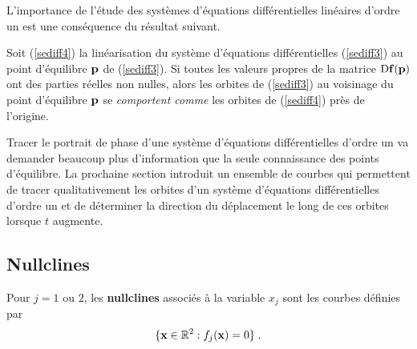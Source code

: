 {L'importance de l'étude des systèmes d'équations différentielles linéaires
d'ordre un est une conséquence du résultat suivant.

\begin{prop} \label{HartGrob}
Soit (\ref{sediff4}) la linéarisation du système d'équations
différentielles (\ref{sediff3}) au point d'équilibre $\mathbf{p}$ de
(\ref{sediff3}).  Si toutes les valeurs propres de la matrice
$\mathrm{D} \mathbf{f}(\mathbf{p})$ ont des parties réelles non nulles, alors les
orbites de (\ref{sediff3}) au voisinage du point d'équilibre
$\mathbf{p}$ se {\em comportent comme} les orbites de (\ref{sediff4})
près de l'origine.
\end{prop}

Tracer le portrait de phase d'une système d'équations différentielles
d'ordre un va demander beaucoup plus d'information que la seule
connaissance des points d'équilibre.  La prochaine section introduit un
ensemble de courbes qui permettent de tracer qualitativement les
orbites d'un système d'équations différentielles d'ordre
un et de déterminer la direction du déplacement le long de ces
orbites lorsque $t$ augmente.

\subsection{Nullclines}

\begin{defn} 
Pour $j=1$ ou $2$, les {\bfseries nullclines} associés à la variable $x_j$
sont les courbes définies par
\[
\{ \mathbf{x}\in \mathbb{R}^2 : f_j(\mathbf{x})=0 \} \; .
\]
\end{defn}

}
